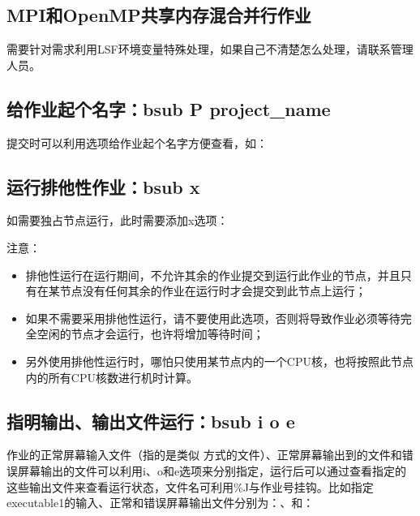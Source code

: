 \documentclass[a4paper,12pt,english]{sphinxmanual}
\begin{document}
\subsection{MPI和OpenMP共享内存混合并行作业}
\label{\detokenize{lsf/lsf:mpiopenmp}}
\sphinxAtStartPar
需要针对需求利用LSF环境变量特殊处理，如果自己不清楚怎么处理，请联系管理人员。


\subsection{给作业起个名字：bsub \sphinxhyphen{}P project\_name}
\label{\detokenize{lsf/lsf:bsub-p-project-name}}
\sphinxAtStartPar
提交时可以利用选项给作业起个名字方便查看，如：

\sphinxAtStartPar
{}


\subsection{运行排他性作业：bsub \sphinxhyphen{}x}
\label{\detokenize{lsf/lsf:bsub-x}}
\sphinxAtStartPar
如需要独占节点运行，此时需要添加\sphinxhyphen{}x选项：

\sphinxAtStartPar
{}

\sphinxAtStartPar
注意：
\begin{itemize}
\item {} 
\sphinxAtStartPar
排他性运行在运行期间，不允许其余的作业提交到运行此作业的节点，并且只有在某节点没有任何其余的作业在运行时才会提交到此节点上运行；

\item {} 
\sphinxAtStartPar
如果不需要采用排他性运行，请不要使用此选项，否则将导致作业必须等待完全空闲的节点才会运行，也许将增加等待时间；

\item {} 
\sphinxAtStartPar
另外使用排他性运行时，哪怕只使用某节点内的一个CPU核，也将按照此节点内的所有CPU核数进行机时计算。

\end{itemize}


\subsection{指明输出、输出文件运行：bsub \sphinxhyphen{}i \sphinxhyphen{}o \sphinxhyphen{}e}
\label{\detokenize{lsf/lsf:bsub-i-o-e}}
\sphinxAtStartPar
作业的正常屏幕输入文件（指的是类似
方式的文件）、正常屏幕输出到的文件和错误屏幕输出的文件可以利用\sphinxhyphen{}i、\sphinxhyphen{}o和\sphinxhyphen{}e选项来分别指定，运行后可以通过查看指定的这些输出文件来查看运行状态，文件名可利用\%J与作业号挂钩。比如指定executable1的输入、正常和错误屏幕输出文件分别为：、和：
\end{document}
